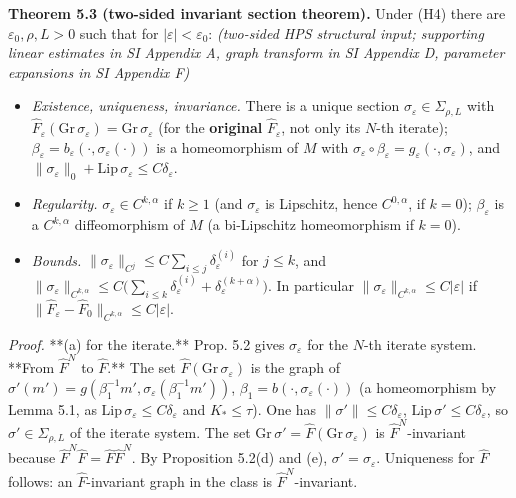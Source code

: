 \documentclass[11pt,a4paper]{article}
\theoremstyle{plain}
\theoremstyle{definition}
\theoremstyle{remark}
\numberwithin{equation}{section}
\numberwithin{figure}{section}
\begin{document}
\textbf{Theorem 5.3 (two-sided invariant section theorem).} Under (H4) there are $\varepsilon_0,\rho,L>0$ such that for $|\varepsilon|<\varepsilon_0$: \textit{(two-sided HPS structural input; supporting linear estimates in SI Appendix A, graph transform in SI Appendix D, parameter expansions in SI Appendix F)}

\begin{itemize}
    \item[(a)] \textit{Existence, uniqueness, invariance.} There is a unique section $\sigma_\varepsilon\in\Sigma_{\rho,L}$ with $\widehat F_\varepsilon(\mathrm{Gr}\,\sigma_\varepsilon)=\mathrm{Gr}\,\sigma_\varepsilon$ (for the \textbf{original} $\widehat F_\varepsilon$, not only its $N$-th iterate); $\beta_\varepsilon=b_\varepsilon(\cdot,\sigma_\varepsilon(\cdot))$ is a homeomorphism of $M$ with $\sigma_\varepsilon\circ\beta_\varepsilon=g_\varepsilon(\cdot,\sigma_\varepsilon)$, and $\|\sigma_\varepsilon\|_0+\mathrm{Lip}\,\sigma_\varepsilon\le C\delta_\varepsilon$.
    \item[(b)] \textit{Regularity.} $\sigma_\varepsilon\in C^{k,\alpha}$ if $k\ge1$ (and $\sigma_\varepsilon$ is Lipschitz, hence $C^{0,\alpha}$, if $k=0$); $\beta_\varepsilon$ is a $C^{k,\alpha}$ diffeomorphism of $M$ (a bi-Lipschitz homeomorphism if $k=0$).
    \item[(c)] \textit{Bounds.} $\|\sigma_\varepsilon\|_{C^j}\le C\sum_{i\le j}\delta^{(i)}_\varepsilon$ for $j\le k$, and $\|\sigma_\varepsilon\|_{C^{k,\alpha}}\le C\big(\sum_{i\le k}\delta^{(i)}_\varepsilon+\delta^{(k+\alpha)}_\varepsilon\big)$. In particular $\|\sigma_\varepsilon\|_{C^{k,\alpha}}\le C|\varepsilon|$ if $\|\widehat F_\varepsilon-\widehat F_0\|_{C^{k,\alpha}}\le C|\varepsilon|$.
\end{itemize}

\textit{Proof.} **(a) for the iterate.** Prop. 5.2 gives $\sigma_\varepsilon$ for the $N$-th iterate system. **From $\widehat F^N$ to $\widehat F$.** The set $\widehat F(\mathrm{Gr}\,\sigma_\varepsilon)$ is the graph of $\sigma'(m')=g(\beta_1^{-1}m',\sigma_\varepsilon(\beta_1^{-1}m'))$, $\beta_1=b(\cdot,\sigma_\varepsilon(\cdot))$ (a homeomorphism by Lemma 5.1, as $\mathrm{Lip}\,\sigma_\varepsilon\le C\delta_\varepsilon$ and $K_*\le\tau$). One has $\|\sigma'\|\le C\delta_\varepsilon$, $\mathrm{Lip}\,\sigma'\le C\delta_\varepsilon$, so $\sigma'\in\Sigma_{\rho,L}$ of the iterate system. The set $\mathrm{Gr}\,\sigma'=\widehat F(\mathrm{Gr}\,\sigma_\varepsilon)$ is $\widehat F^N$-invariant because $\widehat F^N\widehat F=\widehat F\widehat F^N$. By Proposition 5.2(d) and (e), $\sigma'=\sigma_\varepsilon$. Uniqueness for $\widehat F$ follows: an $\widehat F$-invariant graph in the class is $\widehat F^N$-invariant.
\end{document}
